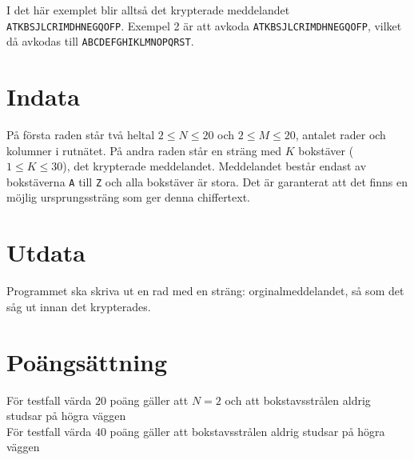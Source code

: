 I det här exemplet blir alltså det krypterade meddelandet \texttt{ATKBSJLCRIMDHNEGQOFP}. Exempel 2 är att avkoda \texttt{ATKBSJLCRIMDHNEGQOFP}, vilket då avkodas till \texttt{ABCDEFGHIKLMNOPQRST}.

\section*{Indata}
På första raden står två heltal $2 \leq N \leq 20$ och $2 \leq M \leq 20$, antalet rader och kolumner i rutnätet.  
På andra raden står en sträng med $K$ bokstäver ($1 \leq K \leq 30$), det krypterade meddelandet. Meddelandet består endast av bokstäverna \texttt{A} till \texttt{Z} och alla bokstäver är stora.
Det är garanterat att det finns en möjlig ursprungssträng som ger denna chiffertext.

\section*{Utdata}
Programmet ska skriva ut en rad med en sträng: orginalmeddelandet, så som det såg ut innan det krypterades.

\section*{Poängsättning}
För testfall värda $20$ poäng gäller att $N=2$ och att bokstavsstrålen aldrig studsar på högra väggen\\
För testfall värda $40$ poäng gäller att bokstavsstrålen aldrig studsar på högra väggen\\
